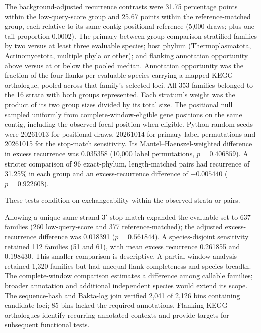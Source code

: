 The background-adjusted recurrence contrasts were 31.75 percentage points within the
low-query-score group and 25.67 points within the reference-matched group, each relative to
its same-contig positional reference (5{,}000 draws; plus-one tail proportion 0.0002).
The primary between-group comparison stratified families by two versus at least three
evaluable species; host phylum (Thermoplasmatota, Actinomycetota, multiple phyla or other);
and flanking annotation opportunity above versus at or below the pooled median. Annotation
opportunity was the fraction of the four flanks per evaluable species carrying a mapped KEGG
orthologue, pooled across that family's selected loci. All 353
families belonged to the 16 strata with both groups represented. Each stratum's weight was
the product of its two group sizes divided by its total size. The positional null sampled
uniformly from complete-window-eligible gene positions on the same contig, including the
observed focal position when eligible. Python random seeds were 20261013 for positional draws,
20261014 for primary label permutations and 20261015 for the stop-match sensitivity. Its Mantel--Haenszel-weighted difference in excess recurrence was
0.035358 (10{,}000 label permutations, $p=0.406859$). A stricter comparison of 96 exact-phylum,
length-matched pairs had recurrence of 31.25\% in each group and an excess-recurrence difference
of $-0.005440$ ($p=0.922608$).

These tests condition on exchangeability within the observed
strata or pairs.

Allowing a unique same-strand 3$'$-stop match expanded the evaluable set to 637 families
(260 low-query-score and 377 reference-matched); the adjusted excess-recurrence difference
was 0.018391 ($p=0.561844$). A species-disjoint sensitivity retained 112 families
(51 and 61), with mean excess recurrence 0.261855 and 0.198430. This smaller comparison is
descriptive. A partial-window analysis retained 1{,}320 families but had unequal flank
completeness and species breadth. The complete-window comparison estimates a difference among
callable families; broader annotation and additional independent species would extend its scope.
The sequence-hash and Bakta-log join verified 2{,}041 of 2{,}126 bins containing candidate loci;
85 bins lacked the required annotations. Flanking KEGG orthologues identify recurring annotated
contexts and provide targets for subsequent functional tests.

